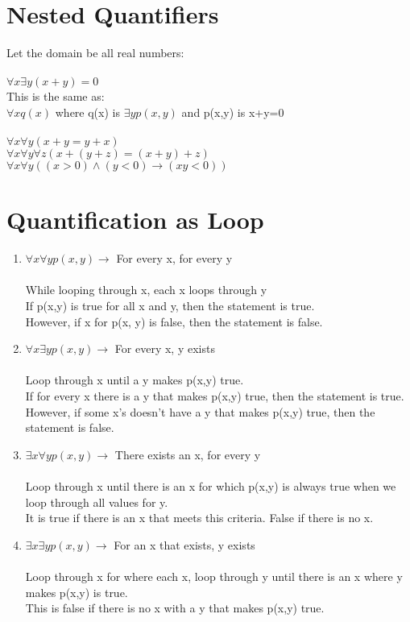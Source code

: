 \documentclass{article}
\begin{document}
\section{Nested Quantifiers}

Let the domain be all real numbers:\\
\\
$\forall x\exists y(x+y)=0$\\
This is the same as:\\
$\forall xq(x)$ where q(x) is $\exists yp(x,y)$ and p(x,y) is x+y=0\\
\\
$\forall x\forall y(x + y = y + x)$\\
$\forall x\forall y\forall z(x + (y + z) = (x + y) + z)$\\
$\forall x\forall y((x > 0)\wedge(y<0)\to (xy<0))$

\section{Quantification as Loop}
\begin{enumerate}
    \item
    $\forall x\forall yp(x,y) \to$ For every x, for every y\\
    \\
    While looping through x, each x loops through y\\
    If p(x,y) is true for all x and y, then the statement is true.\\
    However, if x for p(x, y) is false, then the statement is false.\\

    \item
    $\forall x\exists yp(x,y) \to$ For every x, y exists\\
    \\
    Loop through x until a y makes p(x,y) true.\\
    If for every x there is a y that makes p(x,y) true, then the statement is true.\\
    However, if some x's doesn't have a y that makes p(x,y) true, then the statement is false.\\

    \item
    $\exists x\forall yp(x,y) \to$ There exists an x, for every y\\
    \\
    Loop through x until there is an x for which p(x,y) is always true when we loop through all values for y.\\
    It is true if there is an x that meets this criteria. False if there is no x.\\

    \item
    $\exists x\exists yp(x,y) \to$ For an x that exists, y exists\\
    \\
    Loop through x for where each x, loop through y until there is an x where y makes p(x,y) is true.\\
    This is false if there is no x with a y that makes p(x,y) true.\\
\end{enumerate}
\end{document}

